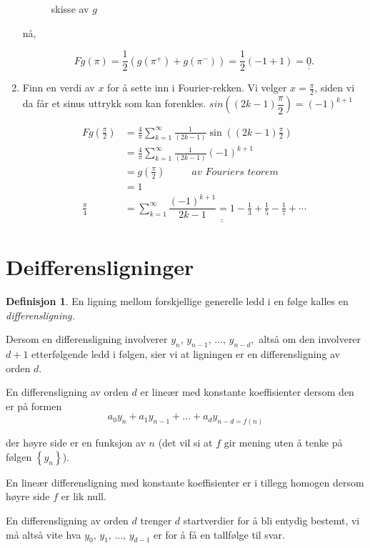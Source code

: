 \documentclass[11pt]{article}
\theoremstyle{definition}
\newtheorem{mindef}{Definisjon}[section]
\newenvironment{fmindef}
{\begin{mdframed}[style=minstil]\begin{mindef}}
		{\end{mindef}\end{mdframed}}
\theoremstyle{definition}
\theoremstyle{definition}
\theoremstyle{definition}
\theoremstyle{definition}
\theoremstyle{definition}
\begin{document}
\begin{enumerate}
\begin{figure}[!ht]
\begin{tikzpicture}[xscale=0.5,yscale=1]
			\end{tikzpicture}
			\caption{ skisse av \(g\)}
		\end{figure}
		
		nå,
		
		\[Fg(\pi)=\frac{1}{2}\left( g(\pi^+)+g(\pi^-)\right)= \frac{1}{2}(-1+1)=\underline{\underline{0}}. \]
		
		\item
		
		Finn en verdi av \(x\) for å sette inn i Fourier-rekken. Vi velger \(x=\frac{\pi}{2}\), siden vi da får et sinus uttrykk som kan forenkles. \(sin\left( (2k-1)\dfrac{\pi}{2}\right)=(-1)^{k+1} \)  
		
		\begin{align*}
		Fg\left( \frac{\pi}{2}\right) &=\frac{4}{\pi}\sum_{k=1}^{\infty}\frac{1}{(2k-1)}\sin\left( (2k-1)\frac{\pi}{2} \right) \\
		&=\frac{4}{\pi}\sum_{k=1}^{\infty}\frac{1}{(2k-1)}(-1)^{k+1}\\&=g\left( \frac{\pi}{2} \right) \hspace{32pt}\textit{av Fouriers teorem}\\
		&=1\\
		\frac{\pi}{4}&=\underline{\underline{\sum_{k=1}^{\infty}\dfrac{(-1)^{k+1}}{2k-1} =1-\frac{1}{3}+\frac{1}{5}-\frac{1}{7}+\cdots}}
		\end{align*}
		
		\end{enumerate}
		
		\newpage 
		
		\section{Deifferensligninger}
		
		\begin{fmindef}
		En ligning mellom forskjellige generelle ledd i en følge kalles en \textit{differensligning.} \medskip
		
		Dersom en differensligning involverer \(y_n,\,y_{n-1},\,\ldots,\, y_{n-d}, \) altså om den involverer \(d+1\) etterfølgende ledd i følgen, sier vi at ligningen er en differensligning av orden \(d\).\medskip
		
		En differensligning av orden \(d\) er lineær med konstante koeffisienter dersom den er på formen \[a_0y_n+a_1y_{n-1}+\ldots+a_dy_{n-d=f(n)} \]
		
		der høyre side er en funksjon av \(n\) (det vil si at \(f\) gir mening uten å tenke på følgen \(\left\lbrace y_n \right\rbrace \)). \medskip
		
		En lineær differensligning med konstante koeffisienter er i tillegg homogen dersom høyre side \(f\) er lik null. \medskip
		
		En differensligning av orden \(d\) trenger \(d\) startverdier for å bli entydig bestemt, vi må altså vite hva \(y_0,\,y_1,\,\ldots,\, y_{d-1} \) er for å få en tallfølge til svar.
		\end{fmindef}
		
\end{document}
